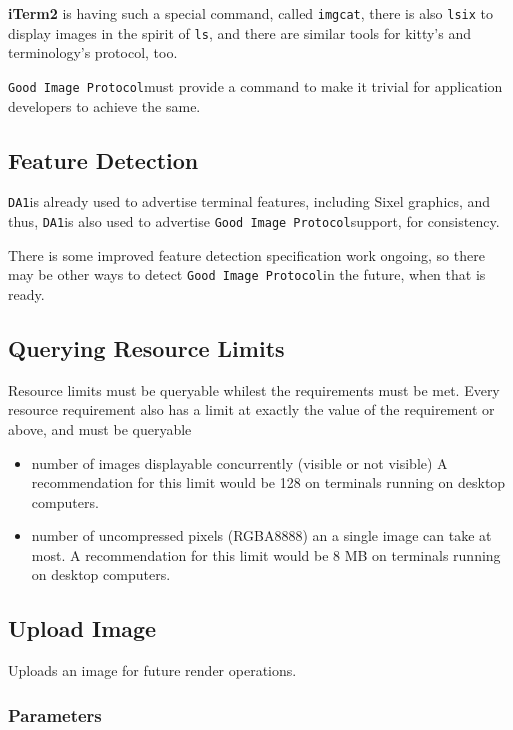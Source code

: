 \documentclass[a4paper]{article}
\newcommand{\code}[1]{\colorbox{light-gray}{\texttt{#1}}}
\newcommand{\DA}{\code{DA1}}
\newcommand{\GoodImageProtocol}{\code{Good Image Protocol}}
\begin{document}
\textbf{iTerm2} is having such a special command, called \code{imgcat},
there is also \code{lsix} to display images in the spirit of \code{ls},
and there are similar tools for kitty's and terminology's protocol, too.

\GoodImageProtocol must provide a command to make it trivial for application
developers to achieve the same.


\subsection{Feature Detection} %

\DA is already used to advertise terminal features, including Sixel graphics, and thus,
\DA is also used to advertise \GoodImageProtocol support, for consistency.

There is some improved feature detection specification work ongoing,
so there may be other ways to detect \GoodImageProtocol in the future, when that is ready.

\subsection{Querying Resource Limits} %

Resource limits must be queryable whilest the requirements must be met.
Every resource requirement also has a limit at exactly
the value of the requirement or above, and must be queryable

\begin{itemize}
    \item number of images displayable concurrently (visible or not visible)
        A recommendation for this limit would be 128 on terminals running on desktop computers.
    \item number of uncompressed pixels (RGBA8888) an a single image can take at most.
        A recommendation for this limit would be 8 MB on terminals running on desktop computers.
\end{itemize}

\subsection{Upload Image} %

Uploads an image for future render operations.

\subsubsection*{Parameters}
\end{document}
